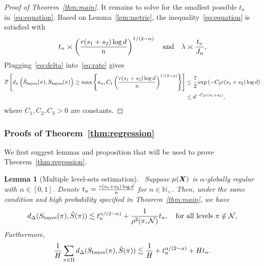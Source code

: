 \documentclass[11pt]{article}
\theoremstyle{plain}
\newtheorem{lem}{Lemma}
\theoremstyle{definition}
\def\bayesS{S_{\textup{bayes}}}
\begin{document}
\begin{proof}[Proof of Theorem~\ref{thm:main}]
It remains to solve for the smallest possible $t_n$ in~\eqref{eq:equation}. Based on Lemma~\ref{lem:metric}, the inequality~\eqref{eq:equation} is satisfied with 
\begin{equation}\label{eq:delta}
t_n\asymp  \left({r(s_1+s_2)\log d \over n}\right)^{1/(2-\alpha)} \quad \text{and}\quad \lambda \asymp {t_n\over J_n},
\end{equation}
Plugging~\eqref{eq:delta} into~\eqref{eq:rate} gives
\begin{align}\label{eq:tail}
\mathbb{P}\left[d_\pi\left(\hat S_{\text{bayes}}(\pi),\bayesS(\pi)\right)\geq  \max\left\{ a_n, C_1\left({r(s_1+s_2)\log d \over n}\right)^{1/(2-\alpha)} \right\}\right]&\leq {7\over 2}\exp\left( - C_2r(s_1+s_2)\log d \right)\notag \\
&\leq d^{-C_3r(s_1+s_2)},
\end{align}
where $C_1, C_2, C_3>0$ are constants.
\end{proof}


\subsubsection{Proofs of Theorem~\ref{thm:regression}}
We first suggest lemmas and proposition that will be used to prove Theorem~\ref{thm:regression}.
\begin{lem}[Multiple level-sets estimation]~\label{lem:main}Suppose $\mu(\bm X)$ is $\alpha$-globally regular with $\alpha\in[0,1]$. Denote $t_n={ r(s_1+s_2)\log d  \over n}$ for $n\in\mathbb{N}_{+}$. Then, under the same condition and high probability specified in Theorem~\ref{thm:main}, we have
\[
d_{\Delta}(\bayesS(\pi),\hat S(\pi))\lesssim t_n^{\alpha/(2-\alpha)}+ {1\over \rho^2(\pi,\tN)}t_n,\quad \text{for all levels }\pi \notin \tN, 
\]
 Furthermore, 
\begin{equation}\label{eq:total}
{1\over H}\sum_{\pi \in \Pi} d_{\Delta}(\bayesS(\pi),\hat S(\pi))\lesssim   {1\over H}+t_n^{\alpha/(2-\alpha)}+ H t_n .
\end{equation}
\end{lem}
\end{document}
